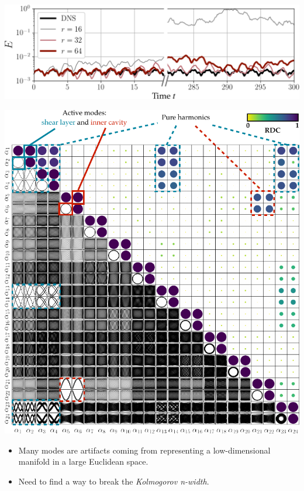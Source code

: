 \documentclass[aspectratio=169,compress,12pt]{beamer}
\begin{document}
\begin{frame}
    \vfill
    \centering
    \includegraphics[width=\textwidth]{imgs/tke_galerkin.png}
    \vfill
\end{frame}

\begin{frame}
    \vfill
    \begin{minipage}{.48\textwidth}
        \includegraphics[width=\textwidth]{imgs/rdc_score.png}
    \end{minipage}%
    \hfill
    \begin{minipage}{.48\textwidth}
        \begin{itemize}
            \item Many modes are artifacts coming from representing a low-dimensional manifold in a large Euclidean space.
            \par\bigskip
            \item Need to find a way to break the \emph{Kolmogorov n-width}.
        \end{itemize}
    \end{minipage}
    \vfill
\end{frame}
\end{document}
